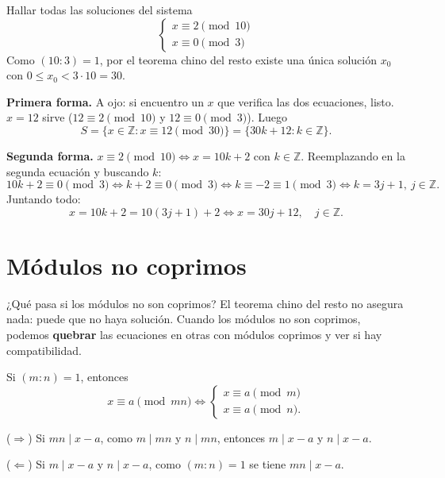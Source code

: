 \begin{ejemplo}
Hallar todas las soluciones del sistema
\[
\begin{cases}
x\equiv 2 \pmod{10}\\
x\equiv 0 \pmod{3}
\end{cases}
\]
Como $(10:3)=1$, por el teorema chino del resto existe una única solución $x_0$
con $0\le x_0<3\cdot 10=30$.

\textbf{Primera forma.} A ojo: si encuentro un $x$ que verifica las dos
ecuaciones, listo. $x=12$ sirve ($12\equiv 2 \pmod{10}$ y $12\equiv 0 \pmod 3$).
Luego
\[
S=\{x\in\mathbb{Z} : x\equiv 12 \pmod{30}\}=\{30k+12 : k\in\mathbb{Z}\}.
\]

\textbf{Segunda forma.} $x\equiv 2 \pmod{10} \iff x=10k+2$ con $k\in\mathbb{Z}$.
Reemplazando en la segunda ecuación y buscando $k$:
\[
10k+2\equiv 0 \pmod 3 \iff k+2\equiv 0 \pmod 3 \iff k\equiv -2\equiv 1 \pmod 3
\iff k=3j+1,\ j\in\mathbb{Z}.
\]
Juntando todo:
\[
x=10k+2=10(3j+1)+2 \iff x=30j+12, \quad j\in\mathbb{Z}.
\]
\end{ejemplo}

\section{Módulos no coprimos}

\begin{teoria}
¿Qué pasa si los módulos no son coprimos? El teorema chino del resto no asegura
nada: puede que no haya solución. Cuando los módulos no son coprimos, podemos
\textbf{quebrar} las ecuaciones en otras con módulos coprimos y ver si hay
compatibilidad.
\end{teoria}

\begin{proposicion}
Si $(m:n)=1$, entonces
\[
x\equiv a \pmod{mn} \iff
\begin{cases}
x\equiv a \pmod m\\
x\equiv a \pmod n.
\end{cases}
\]
\end{proposicion}

\begin{demostracion}
($\Rightarrow$) Si $mn\mid x-a$, como $m\mid mn$ y $n\mid mn$, entonces
$m\mid x-a$ y $n\mid x-a$.

($\Leftarrow$) Si $m\mid x-a$ y $n\mid x-a$, como $(m:n)=1$ se tiene
$mn\mid x-a$.
\end{demostracion}

